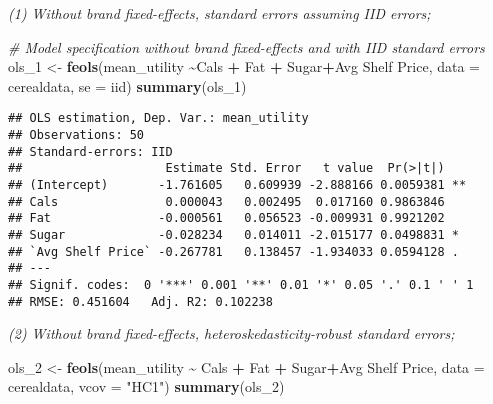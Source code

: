 \documentclass[
]{article}
\newenvironment{Shaded}{\begin{snugshade}}{\end{snugshade}}
\newcommand{\AttributeTok}[1]{\textcolor[rgb]{0.13,0.29,0.53}{#1}}
\newcommand{\CommentTok}[1]{\textcolor[rgb]{0.56,0.35,0.01}{\textit{#1}}}
\newcommand{\FunctionTok}[1]{\textcolor[rgb]{0.13,0.29,0.53}{\textbf{#1}}}
\newcommand{\NormalTok}[1]{#1}
\newcommand{\OtherTok}[1]{\textcolor[rgb]{0.56,0.35,0.01}{#1}}
\newcommand{\SpecialCharTok}[1]{\textcolor[rgb]{0.81,0.36,0.00}{\textbf{#1}}}
\newcommand{\StringTok}[1]{\textcolor[rgb]{0.31,0.60,0.02}{#1}}
\begin{document}
\emph{(1) Without brand fixed-effects, standard errors assuming IID
errors;}

\begin{Shaded}
\begin{Highlighting}[]
\CommentTok{\# Model specification without brand fixed{-}effects and with IID standard errors}
\NormalTok{ols\_1 }\OtherTok{\textless{}{-}} \FunctionTok{feols}\NormalTok{(mean\_utility }\SpecialCharTok{\textasciitilde{}}\NormalTok{Cals }\SpecialCharTok{+}\NormalTok{ Fat }\SpecialCharTok{+}\NormalTok{ Sugar}\SpecialCharTok{+}\StringTok{\textasciigrave{}}\AttributeTok{Avg Shelf Price}\StringTok{\textasciigrave{}}\NormalTok{, }\AttributeTok{data =}\NormalTok{ cerealdata, }\AttributeTok{se =} \StringTok{\textquotesingle{}iid\textquotesingle{}}\NormalTok{)}
\FunctionTok{summary}\NormalTok{(ols\_1)}
\end{Highlighting}
\end{Shaded}

\begin{verbatim}
## OLS estimation, Dep. Var.: mean_utility
## Observations: 50
## Standard-errors: IID 
##                    Estimate Std. Error   t value  Pr(>|t|)    
## (Intercept)       -1.761605   0.609939 -2.888166 0.0059381 ** 
## Cals               0.000043   0.002495  0.017160 0.9863846    
## Fat               -0.000561   0.056523 -0.009931 0.9921202    
## Sugar             -0.028234   0.014011 -2.015177 0.0498831 *  
## `Avg Shelf Price` -0.267781   0.138457 -1.934033 0.0594128 .  
## ---
## Signif. codes:  0 '***' 0.001 '**' 0.01 '*' 0.05 '.' 0.1 ' ' 1
## RMSE: 0.451604   Adj. R2: 0.102238
\end{verbatim}

\emph{(2) Without brand fixed-effects, heteroskedasticity-robust
standard errors;}

\begin{Shaded}
\begin{Highlighting}[]
\NormalTok{ols\_2 }\OtherTok{\textless{}{-}} \FunctionTok{feols}\NormalTok{(mean\_utility }\SpecialCharTok{\textasciitilde{}}\NormalTok{ Cals }\SpecialCharTok{+}\NormalTok{ Fat }\SpecialCharTok{+}\NormalTok{ Sugar}\SpecialCharTok{+}\StringTok{\textasciigrave{}}\AttributeTok{Avg Shelf Price}\StringTok{\textasciigrave{}}\NormalTok{, }\AttributeTok{data =}\NormalTok{ cerealdata, }\AttributeTok{vcov =} \StringTok{"HC1"}\NormalTok{)}
\FunctionTok{summary}\NormalTok{(ols\_2)}
\end{Highlighting}
\end{Shaded}
\end{document}

